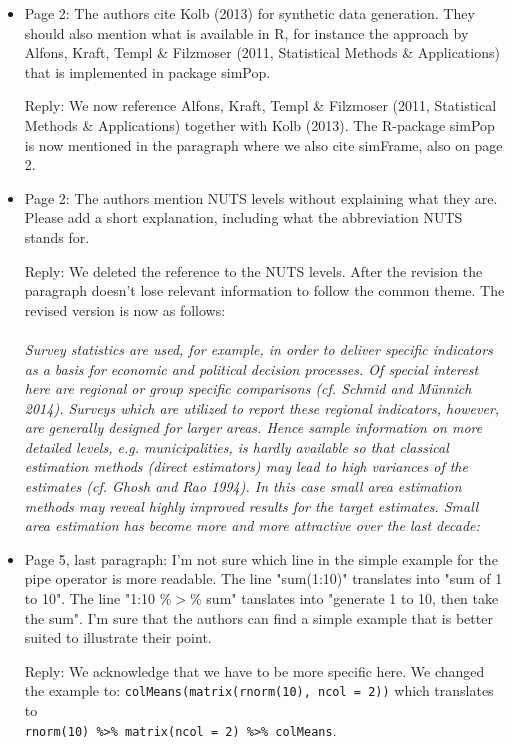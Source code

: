 \documentclass[11pt]{article}
\begin{document}
\begin{itemize}
\item
	Page 2: The authors cite Kolb (2013) for synthetic data generation. They should also mention what is available in R, for instance the approach by Alfons, Kraft, Templ \& Filzmoser (2011, Statistical Methods \& Applications) that is implemented in package simPop.
	
	Reply: We now reference Alfons, Kraft, Templ \& Filzmoser (2011, Statistical Methods \& Applications) together with Kolb (2013). The R-package simPop is now mentioned in the paragraph where we also cite simFrame, also on page 2.

\item
	Page 2: The authors mention NUTS levels without explaining what they are. Please add a short explanation, including what the abbreviation NUTS stands for.
	
	Reply: We deleted the reference to the NUTS levels. After the revision the paragraph doesn't lose relevant information to follow the common theme. The revised version is now as follows:\\\\
	\textit{
Survey statistics are used, for example, in order to deliver specific indicators as a basis for
economic and political decision processes. Of special interest here are regional or group
specific comparisons (cf. Schmid and Münnich 2014). Surveys which are utilized to report
these regional indicators, however, are generally designed for larger areas. Hence sample
information on more detailed levels, e.g. municipalities, is hardly available so that classical
estimation methods (direct estimators) may lead to high variances of the estimates (cf. Ghosh
and Rao 1994). In this case small area estimation methods may reveal highly improved results
for the target estimates. Small area estimation has become more and more attractive over
the last decade:
	}

\item
	Page 5, last paragraph: I'm not sure which line in the simple example for the pipe operator is more readable. The line "sum(1:10)" translates into "sum of 1 to 10". The line "1:10 \%$>$\% sum" tanslates into "generate 1 to 10, then take the sum". I'm sure that the authors can find a simple example that is better suited to illustrate their point.
	
	Reply: We acknowledge that we have to be more specific here. We changed the example to:
	\verb'colMeans(matrix(rnorm(10), ncol = 2))' which translates to \\\verb'rnorm(10) %>% matrix(ncol = 2) %>% colMeans'.


\end{itemize}
\end{document}
